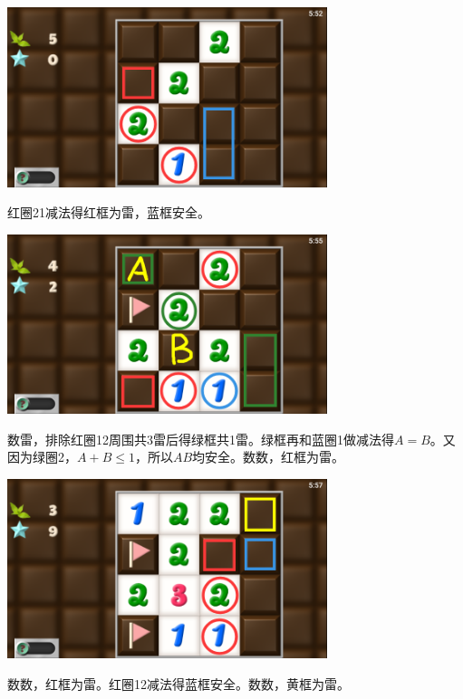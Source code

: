 \subsection{} %
\begin{center}
    \includegraphics[width=0.7\textwidth]{puzzle/66-1.png}
\end{center}
红圈21减法得红框为雷，蓝框安全。
\begin{center}
    \includegraphics[width=0.7\textwidth]{puzzle/66-2.png}
\end{center}
数雷，排除红圈12周围共3雷后得绿框共1雷。绿框再和蓝圈1做减法得$A=B$。又因为绿圈2，$A+B\le 1$，所以$AB$均安全。数数，红框为雷。
\begin{center}
    \includegraphics[width=0.7\textwidth]{puzzle/66-3.png}
\end{center}
数数，红框为雷。红圈12减法得蓝框安全。数数，黄框为雷。

